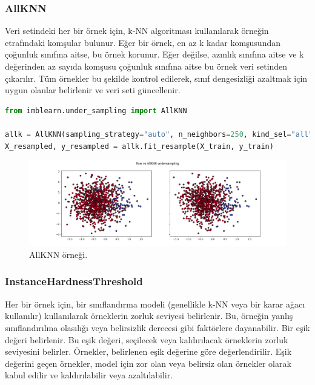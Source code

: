 \subsubsection{AllKNN}
Veri setindeki her bir örnek için, k-NN algoritması kullanılarak örneğin etrafındaki komşular bulunur. Eğer bir örnek, en az k kadar komşusundan çoğunluk sınıfına aitse, bu örnek korunur. Eğer değilse, azınlık sınıfına aitse ve k değerinden az sayıda komşusu çoğunluk sınıfına aitse bu örnek veri setinden çıkarılır. Tüm örnekler bu şekilde kontrol edilerek, sınıf dengesizliği azaltmak için uygun olanlar belirlenir ve veri seti güncellenir.

\begin{lstlisting}[language=Python]
from imblearn.under_sampling import AllKNN

allk = AllKNN(sampling_strategy="auto", n_neighbors=250, kind_sel="all")
X_resampled, y_resampled = allk.fit_resample(X_train, y_train)
\end{lstlisting}

\begin{figure}[h]
    \centering
    \includegraphics[width=1\textwidth]{images/Raw vs AllKNN undersampling.png}
    \caption{AllKNN örneği.}
    \label{fig:enter-label}
\end{figure}

\newpage

\subsubsection{InstanceHardnessThreshold}
Her bir örnek için, bir sınıflandırma modeli (genellikle k-NN veya bir karar ağacı kullanılır) kullanılarak örneklerin zorluk seviyesi belirlenir. Bu, örneğin yanlış sınıflandırılma olasılığı veya belirsizlik derecesi gibi faktörlere dayanabilir. Bir eşik değeri belirlenir. Bu eşik değeri, seçilecek veya kaldırılacak örneklerin zorluk seviyesini belirler. Örnekler, belirlenen eşik değerine göre değerlendirilir. Eşik değerini geçen örnekler, model için zor olan veya belirsiz olan örnekler olarak kabul edilir ve kaldırılabilir veya azaltılabilir.

